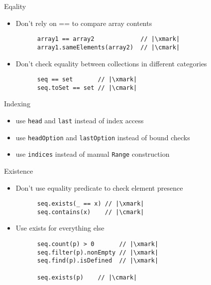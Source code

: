 \documentclass[aspectratio=169]{beamer}
\begin{document}
\begin{frame}[fragile]{Eqality}
  \begin{itemize}
    \item Don’t rely on == to compare array contents \\
      \begin{verbatim}
      array1 == array2             // |\xmark|
      array1.sameElements(array2)  // |\cmark|
      \end{verbatim}
      \pause
    \item Don’t check equality between collections in different categories \\
      \begin{verbatim}
      seq == set       // |\xmark|
      seq.toSet == set // |\cmark|
      \end{verbatim}
  \end{itemize}
\end{frame}

\begin{frame}[fragile]{Indexing}
  \begin{itemize}
    \item use \texttt{head} and \texttt{last} instead of index access
      \pause
    \item use \texttt{headOption} and \texttt{lastOption} instead of bound checks
      \pause
    \item use \texttt{indices} instead of manual \texttt{Range} construction
  \end{itemize}
\end{frame}

\begin{frame}[fragile]{Existence}
  \begin{itemize}
    \item Don’t use equality predicate to check element presence \\
      \begin{verbatim}
      seq.exists(_ == x) // |\xmark|
      seq.contains(x)    // |\cmark|
      \end{verbatim}
      \pause
    \item Use exists for everything else \\
      \begin{verbatim}
      seq.count(p) > 0       // |\xmark|
      seq.filter(p).nonEmpty // |\xmark|
      seq.find(p).isDefined  // |\xmark|

      seq.exists(p)    // |\cmark|
      \end{verbatim}
  \end{itemize} 
\end{frame}
\end{document}
